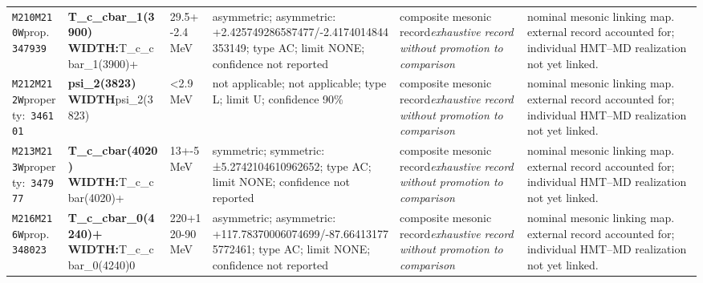 \begin{landscape}
\begin{longtable}{L{1.85cm}L{4.45cm}L{2.35cm}L{4.05cm}L{3.35cm}L{7.15cm}}
\texttt{M210}\newline \texttt{M210W}\newline prop.\ \texttt{347939} & \textbf{T\_\allowbreak{}c\_\allowbreak{}cbar\_\allowbreak{}1(3900) WIDTH:}\newline T\_\allowbreak{}c\_\allowbreak{}cbar\_\allowbreak{}1(3900)+ & 29.5+-2.4\,MeV & asymmetric; asymmetric: +2.425749286587477/-2.4174014844353149; type AC; limit NONE; confidence not reported & composite mesonic record\newline \emph{exhaustive record without promotion to comparison} & nominal mesonic linking map. external record accounted for; individual HMT--MD realization not yet linked. \\
\texttt{M212}\newline \texttt{M212W}\newline property:\ \texttt{346101} & \textbf{psi\_\allowbreak{}2(3823) WIDTH}\newline psi\_\allowbreak{}2(3823) & \textless{}2.9\,MeV & not applicable; not applicable; type L; limit U; confidence 90\% & composite mesonic record\newline \emph{exhaustive record without promotion to comparison} & nominal mesonic linking map. external record accounted for; individual HMT--MD realization not yet linked. \\
\texttt{M213}\newline \texttt{M213W}\newline property:\ \texttt{347977} & \textbf{T\_\allowbreak{}c\_\allowbreak{}cbar(4020) WIDTH:}\newline T\_\allowbreak{}c\_\allowbreak{}cbar(4020)+ & 13+-5\,MeV & symmetric; symmetric: ±5.2742104610962652; type AC; limit NONE; confidence not reported & composite mesonic record\newline \emph{exhaustive record without promotion to comparison} & nominal mesonic linking map. external record accounted for; individual HMT--MD realization not yet linked. \\
\texttt{M216}\newline \texttt{M216W}\newline prop.\ \texttt{348023} & \textbf{T\_\allowbreak{}c\_\allowbreak{}cbar\_\allowbreak{}0(4240)+ WIDTH:}\newline T\_\allowbreak{}c\_\allowbreak{}cbar\_\allowbreak{}0(4240)0 & 220+120-90\,MeV & asymmetric; asymmetric: +117.78370006074699/-87.664131775772461; type AC; limit NONE; confidence not reported & composite mesonic record\newline \emph{exhaustive record without promotion to comparison} & nominal mesonic linking map. external record accounted for; individual HMT--MD realization not yet linked. \\

\end{longtable}
\end{landscape}
